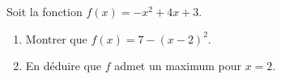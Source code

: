 
\begin{exercice}\label{exosmath-0050}

    Soit la fonction \( f(x)=-x^2+4x+3\).
    \begin{enumerate}
        \item
            Montrer que \( f(x)=7-(x-2)^2\).
        \item
            En déduire que \( f\) admet un maximum pour \( x=2\).
    \end{enumerate}

\end{exercice}
